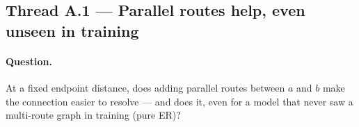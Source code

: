 \documentclass[11pt,a4paper]{article}
\begin{document}
\subsection{Thread A.1 --- Parallel routes help, even unseen in training}
\label{sec:res-multipath-clean}
\paragraph{Question.} At a fixed endpoint distance, does adding parallel routes between $a$ and $b$
make the connection easier to resolve --- and does it, even for a model that never saw a multi-route
graph in training (pure ER)?
\end{document}
